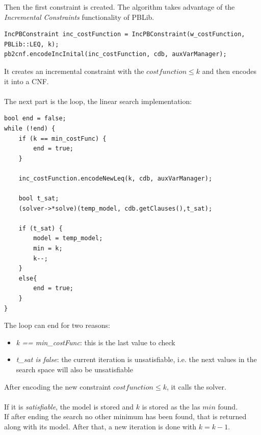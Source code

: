 Then the first constraint is created. The algorithm takes advantage of the \emph{Incremental Constraints} functionality of PBLib.
\begin{verbatim}
IncPBConstraint inc_costFunction = IncPBConstraint(w_costFunction, PBLib::LEQ, k);
pb2cnf.encodeIncInital(inc_costFunction, cdb, auxVarManager);
\end{verbatim}
It creates an incremental constraint with the $cost function \leq k$ and then encodes it into a CNF.\\\\
The next part is the loop, the linear search implementation:
\begin{verbatim}
bool end = false;
while (!end) {
    if (k == min_costFunc) {
        end = true;
    }
	
    inc_costFunction.encodeNewLeq(k, cdb, auxVarManager);
	
    bool t_sat;
    (solver->*solve)(temp_model, cdb.getClauses(),t_sat);
	
    if (t_sat) {
        model = temp_model;
        min = k;
        k--;
    }
    else{
        end = true;
    }
}
\end{verbatim}
The loop can end for two reasons:
\begin{itemize}
	\item \emph{k == min\_costFunc}: this is the last value to check
	\item \emph{t\_sat is false}: the current iteration is unsatisfiable, i.e. the next values in the search space will also be unsatisfiable 
\end{itemize}
After encoding the new constraint $cost function \leq k$, it calls the solver.\\\\
If it is \emph{satisfiable}, the model is stored and $k$ is stored as the las $min$ found.\\
If after ending the search no other minimum has been found, that is returned along with its model. After that, a new iteration is done with $k=k-1$.

